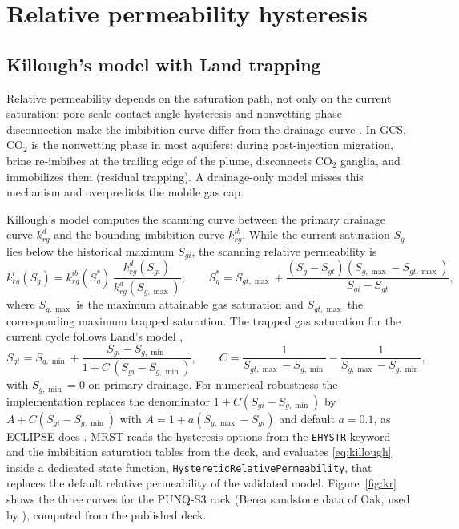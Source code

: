 \documentclass[preprint,11pt]{elsarticle}
\begin{document}
\section{Relative permeability hysteresis}
\label{sec:hyst}

\subsection{Killough's model with Land trapping}

Relative permeability depends on the saturation path, not only on the
current saturation: pore-scale contact-angle hysteresis and nonwetting
phase disconnection make the imbibition curve differ from the drainage
curve \cite{juanes2006}. In GCS, CO$_2$ is the nonwetting phase in most
aquifers; during post-injection migration, brine re-imbibes at the
trailing edge of the plume, disconnects CO$_2$ ganglia, and immobilizes
them (residual trapping). A drainage-only model misses this mechanism
and overpredicts the mobile gas cap.

Killough's model \cite{killough1976} computes the scanning curve between
the primary drainage curve $k^d_{rg}$ and the bounding imbibition curve
$k^{ib}_{rg}$. While the current saturation $S_g$ lies below the
historical maximum $S_{gi}$, the scanning relative permeability is
\begin{equation}
k^{i}_{rg}(S_g) = k^{ib}_{rg}(S_g^*)\,
\frac{k^{d}_{rg}(S_{gi})}{k^{d}_{rg}(S_{g,\max})},
\qquad
S_g^* = S_{gt,\max} + \frac{(S_g - S_{gt})(S_{g,\max} -
S_{gt,\max})}{S_{gi} - S_{gt}},
\label{eq:killough}
\end{equation}
where $S_{g,\max}$ is the maximum attainable gas saturation and
$S_{gt,\max}$ the corresponding maximum trapped saturation. The trapped
gas saturation for the current cycle follows Land's model
\cite{land1968},
\begin{equation}
S_{gt} = S_{g,\min} + \frac{S_{gi} - S_{g,\min}}
{1 + C\,(S_{gi} - S_{g,\min})},
\qquad
C = \frac{1}{S_{gt,\max} - S_{g,\min}} - \frac{1}{S_{g,\max} -
S_{g,\min}},
\label{eq:land}
\end{equation}
with $S_{g,\min}=0$ on primary drainage. For numerical robustness the
implementation replaces the denominator $1 + C(S_{gi}-S_{g,\min})$ by
$A + C(S_{gi}-S_{g,\min})$ with $A = 1 + a(S_{g,\max}-S_{gi})$ and
default $a=0.1$, as ECLIPSE does \cite{salo2024}. MRST reads the
hysteresis options from the \texttt{EHYSTR} keyword and the imbibition
saturation tables from the deck, and evaluates \eqref{eq:killough} inside
a dedicated state function, \texttt{HystereticRelativePermeability},
that replaces the default relative permeability of the validated model.
Figure~\ref{fig:kr} shows the three curves for the PUNQ-S3 rock (Berea
sandstone data of Oak, used by \cite{juanes2006}), computed from the
published deck.
\end{document}
